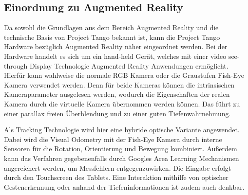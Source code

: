 \subsection{Einordnung zu Augmented Reality} \label{sec:classification_project_tango}

Da sowohl die Grundlagen aus dem Bereich Augmented Reality und die technische Basis von Project Tango bekannt ist, kann die Project Tango Hardware bezüglich Augmented Reality näher eingeordnet werden. Bei der Hardware handelt es sich um ein hand-held Gerät, welches mit einer video see-through Display Technologie Augmented Reality Anwendungen ermöglicht. Hierfür kann wahlweise die normale RGB Kamera oder die Graustufen Fish-Eye Kamera verwendet werden. Denn für beide Kameras können die intrinsischen Kameraparameter ausgelesen werden, wodurch die Eigenschaften der realen Kamera durch die virtuelle Kamera übernommen werden können. Das führt zu einer parallax freien Überblendung und zu einer guten Tiefenwahrnehmung. 

Als Tracking Technologie wird hier eine hybride optische Variante angewendet. Dabei wird die Visual Odometry mit der Fish-Eye Kamera durch interne Sensoren für die Rotation, Orientierung und Bewegung kombiniert. Außerdem kann das Verfahren gegebenenfalls durch Googles Area Learning Mechanismen angereichert werden, um Messfehlern entgegenzuwirken. Die Eingabe erfolgt durch den Touchscreen des Tablets. Eine Interaktion mithilfe von optischer Gestenerkennung oder anhand der Tiefeninformationen ist zudem auch denkbar. 


